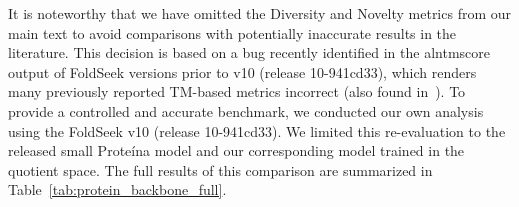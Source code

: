 It is noteworthy that we have omitted the Diversity and Novelty metrics from our main text to avoid comparisons with potentially inaccurate results in the literature. 
This decision is based on a bug recently identified in the alntmscore output of FoldSeek versions prior to v10 (release 10-941cd33), which renders many previously reported TM-based metrics incorrect (also found in~\citep{daras2025ambient}). 
To provide a controlled and accurate benchmark, we conducted our own analysis using the FoldSeek v10 (release 10-941cd33).
We limited this re-evaluation to the released small Proteína model and our corresponding model trained in the quotient space. The full results of this comparison are summarized in Table~\ref{tab:protein_backbone_full}.

\begin{table}[htbp]
\centering
\footnotesize
\caption{Complete performance comparison of the released Prote\'ina checkpoints against our version in the quotient space. Best results are marked in \textbf{bold}.}
\label{tab:protein_backbone_full}
\vspace{0.3cm}
\end{table}
